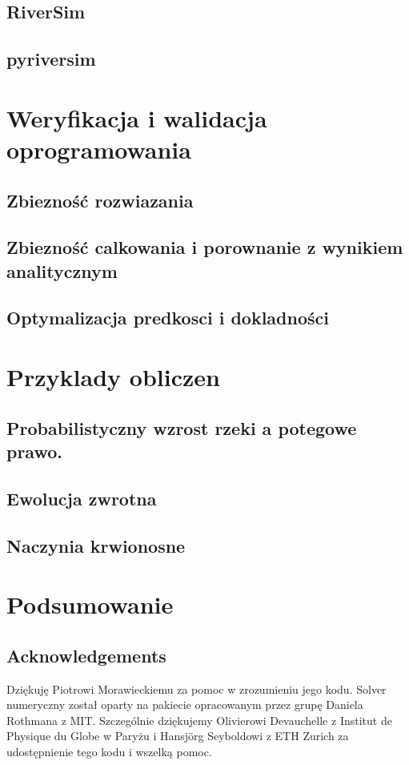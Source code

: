 \documentclass[]{pracamgr}
\begin{document}
    \section{RiverSim}
    \section{pyriversim}

  \chapter{Weryfikacja i walidacja oprogramowania}
    \section{Zbiezność rozwiazania}
    \section{Zbiezność calkowania i porownanie z wynikiem analitycznym}
    \section{Optymalizacja predkosci i dokladności}



  \chapter{Przyklady obliczen}
    \section{Probabilistyczny wzrost rzeki a potegowe prawo.}
    \section{Ewolucja zwrotna}
    \section{Naczynia krwionosne}

  \chapter{Podsumowanie}

  \section*{Acknowledgements}
    Dziękuję Piotrowi Morawieckiemu za pomoc w zrozumieniu jego kodu. Solver numeryczny został oparty na pakiecie opracowanym przez grupę Daniela Rothmana z MIT. Szczególnie dziękujemy Olivierowi Devauchelle z Institut de Physique du Globe w Paryżu i Hansj\"{o}rg Seyboldowi z ETH Zurich za udostępnienie tego kodu i wszelką pomoc.
\end{document}
